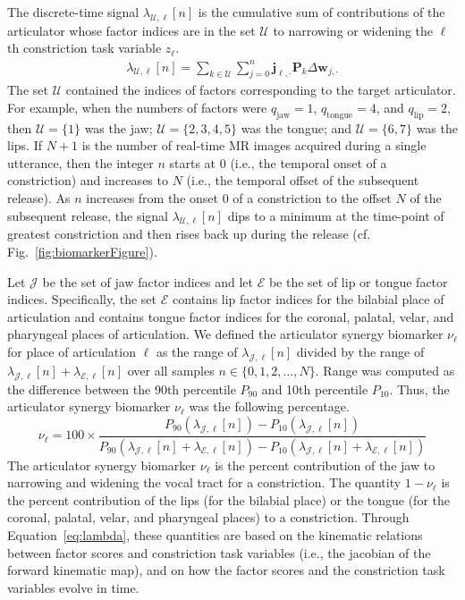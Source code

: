\documentclass[preprint]{JASAnew}\usepackage[]{graphicx}\usepackage[]{color}
\begin{document}
The discrete-time signal $\lambda_{\mathcal{U},\ell}[n]$ is the cumulative sum of contributions of the articulator whose factor indices are in the set $\mathcal{U}$ to narrowing or widening the $\ell$th constriction task variable $z_\ell$. 
\begin{align}
\label{eq:lambda}
\lambda_{\mathcal{U},\ell} \left[ n \right]
	= \sum_{k\in \mathcal{U}} \sum_{j=0}^{n} \mathbf{j}_{\ell,\cdot} \mathbf{P}_k \Delta \mathbf{w}_{j,\cdot}
\end{align}
The set $\mathcal{U}$ contained the indices of factors corresponding to the target articulator. For example, when the numbers of factors were $q_\text{jaw} = 1$, $q_\text{tongue} = 4$, and $q_\text{lip} = 2$, then  $\mathcal{U}=\{1\}$ was the jaw; $\mathcal{U}=\{2,3,4,5\}$ was the tongue; and $\mathcal{U}=\{6,7\}$ was the lips.
%
If $N+1$ is the number of real-time MR images acquired during a single utterance, then the integer $n$ starts at $0$ (i.e., the temporal onset of a constriction) and increases to $N$ (i.e., the temporal offset of the subsequent release). 
%
As $n$ increases from the onset $0$ of a constriction to the offset $N$ of the subsequent release, the signal $\lambda_{\mathcal{U},\ell}[n]$ dips to a minimum at the time-point of greatest constriction and then rises back up during the release (cf. Fig.~\ref{fig:biomarkerFigure}).



Let $\mathcal{J}$ be the set of jaw factor indices and let $\mathcal{E}$ be the set of lip or tongue factor indices. Specifically, the set $\mathcal{E}$ contains lip factor indices for the bilabial place of articulation and contains tongue factor indices for the coronal, palatal, velar, and pharyngeal places of articulation. 
%
We defined the articulator synergy biomarker $\nu_\ell$ for place of articulation $\ell$ as the range of $\lambda_{\mathcal{J},\ell} [ n ]$ divided by the range of $\lambda_{\mathcal{J},\ell} [ n ] + \lambda_{\mathcal{E},\ell} [ n ]$
over all samples $n \in \{0, 1, 2, \ldots, N\}$.
%
Range was computed as the difference between the 90th percentile $P_{90}$ and 10th percentile $P_{10}$. 
%
Thus, the articulator synergy biomarker $\nu_\ell$ was the following percentage.
\begin{equation}
\label{eq:nu}
\nu_\ell
= 
100 \times
\frac{P_{90}\left( \lambda_{\mathcal{J},\ell} [n] \right) - P_{10}\left( \lambda_{\mathcal{J},\ell} [n] \right)}
{P_{90}\left( \lambda_{\mathcal{J},\ell} [n] + \lambda_{\mathcal{E},\ell} [n] \right) - P_{10}\left( \lambda_{\mathcal{J},\ell} [n] + \lambda_{\mathcal{E},\ell} [n]\right)}
\end{equation}
%
The articulator synergy biomarker $\nu_\ell$ is the percent contribution of the jaw to narrowing and widening the vocal tract for a constriction. 
%
The quantity $1-\nu_\ell$ is the percent contribution of the lips (for the bilabial place) or the tongue (for the coronal, palatal, velar, and pharyngeal places) to a constriction. 
%
Through Equation~\ref{eq:lambda}, these quantities are based on the kinematic relations between factor scores and constriction task variables (i.e., the jacobian of the forward kinematic map), and on how the factor scores and the constriction task variables evolve in time.
\end{document}
